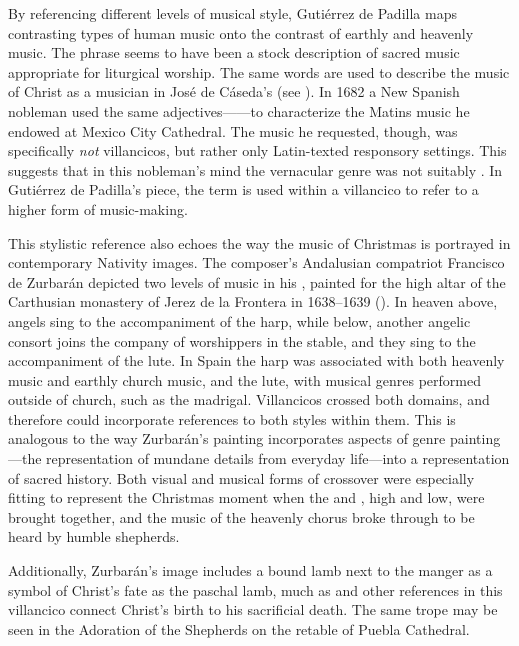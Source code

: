 By referencing different levels of musical style, Gutiérrez de Padilla maps
contrasting types of human music onto the contrast of earthly and heavenly
music.
The phrase  seems to have been a stock description
of sacred music appropriate for liturgical worship.%
    \Autocite
    [On  and other common vocabulary used for music in Spanish
    poetry, see][]{UribeBracho:OrfeoPhD}
The same words are used to describe the music of Christ as a musician in José
de Cáseda's  (see ).
In 1682 a New Spanish nobleman used the same adjectives------to characterize the Matins music he endowed at Mexico City
Cathedral.%
    \Autocite[140--141]{Goldman:Responsory}
The music he requested, though, was specifically \emph{not} villancicos, but
rather only Latin-texted responsory settings.
This suggests that in this nobleman's mind the vernacular genre was not suitably
.
In Gutiérrez de Padilla's piece, the term is used within a villancico to
refer to a higher form of music-making. 


This stylistic reference also echoes the way the music of Christmas is portrayed
in contemporary Nativity images.
The composer's Andalusian compatriot Francisco de Zurbarán depicted two levels
of music in his , painted for the high altar
of the Carthusian monastery of Jerez de la Frontera in 1638--1639
().%
    \Autocite
    [Gutiérrez de Padilla had been chapelmaster of the cathedral of Jerez de la
    Frontera in 1612--1616;][]
    {Gembero:Padilla}
In heaven above, angels sing to the accompaniment of the harp, while below,
another angelic consort joins the company of worshippers in the stable, and they
sing to the accompaniment of the lute.
In Spain the harp was associated with both heavenly music and earthly church
music, and the lute, with musical genres performed outside of church, such as
the madrigal.
Villancicos crossed both domains, and therefore could incorporate references to
both styles within them.
This is analogous to the way Zurbarán's painting incorporates aspects of genre
painting---the representation of mundane details from everyday life---into a
representation of sacred history.%
    \Autocites
    [31]{Sanchez:Zurbaran}
    {Cherry:Bodegon}
    {Haraszti-Takacs:Genre}
Both visual and musical forms of crossover were especially fitting to represent
the Christmas moment when the  and , high and low,
were brought together, and the music of the heavenly chorus broke through to be
heard by humble shepherds.%
\begin{Footnote}
    Additionally, Zurbarán's image includes a bound lamb next to the manger as a
    symbol of Christ's fate as the paschal lamb, much as  and other references in this villancico connect Christ's birth
    to his sacrificial death.
    The same trope may be seen in the Adoration of the Shepherds on the retable
    of Puebla Cathedral.
\end{Footnote}

